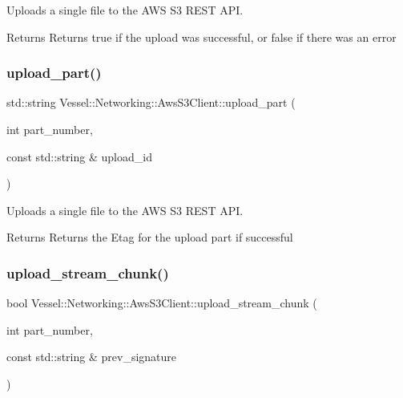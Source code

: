 Uploads a single file to the A\+WS S3 R\+E\+ST A\+PI. 

\begin{DoxyReturn}{Returns}
Returns true if the upload was successful, or false if there was an error 
\end{DoxyReturn}
\mbox{\label{class_vessel_1_1_networking_1_1_aws_s3_client_a2588b9b6a22ea6610e4a4eddec2973de}} 
\subsubsection{\texorpdfstring{upload\+\_\+part()}{upload\_part()}}
{\footnotesize\ttfamily std\+::string Vessel\+::\+Networking\+::\+Aws\+S3\+Client\+::upload\+\_\+part (\begin{DoxyParamCaption}\item[{int}]{part\+\_\+number,  }\item[{const std\+::string \&}]{upload\+\_\+id }\end{DoxyParamCaption})}



Uploads a single file to the A\+WS S3 R\+E\+ST A\+PI. 

\begin{DoxyReturn}{Returns}
Returns the Etag for the upload part if successful 
\end{DoxyReturn}
\mbox{\label{class_vessel_1_1_networking_1_1_aws_s3_client_aa5d5c62b27ceb78262a33d835abaa8be}} 
\subsubsection{\texorpdfstring{upload\+\_\+stream\+\_\+chunk()}{upload\_stream\_chunk()}}
{\footnotesize\ttfamily bool Vessel\+::\+Networking\+::\+Aws\+S3\+Client\+::upload\+\_\+stream\+\_\+chunk (\begin{DoxyParamCaption}\item[{int}]{part\+\_\+number,  }\item[{const std\+::string \&}]{prev\+\_\+signature }\end{DoxyParamCaption})}



